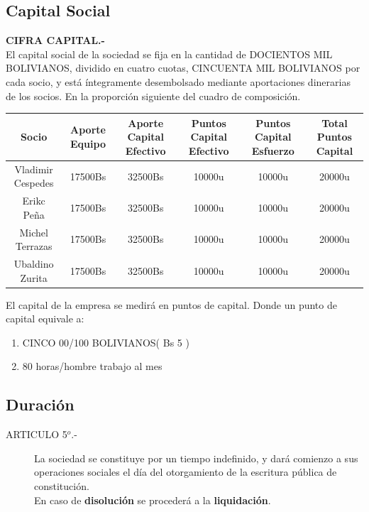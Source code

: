 \documentclass[11pt,letterpaper]{report}
\begin{document}
\subsection{ Capital Social }
\begin{description}
\item[ARTICULO 4$^{o}$.-] {\bf CIFRA CAPITAL.-}\\ El capital social de la sociedad se fija en la cantidad de DOCIENTOS MIL BOLIVIANOS, dividido en cuatro cuotas, CINCUENTA MIL BOLIVIANOS por cada socio, y est\'a \'integramente desembolsado mediante aportaciones dinerarias de los socios. En la proporci\'on siguiente del cuadro de composici\'on.


\begin{tabular}{|c|c|c|c|c|c|}
\hline
Socio & {\tiny Aporte Equipo} & {\tiny Aporte Capital Efectivo } & {\tiny Puntos Capital Efectivo } & {\tiny Puntos Capital Esfuerzo } & {\tiny Total Puntos Capital} \\\hline
Vladimir Cespedes & 17500Bs & 32500Bs & 10000u & 10000u & 20000u \\\hline
Erikc Pe\~na & 17500Bs & 32500Bs & 10000u & 10000u & 20000u \\\hline
Michel Terrazas & 17500Bs & 32500Bs & 10000u & 10000u & 20000u \\\hline
Ubaldino Zurita & 17500Bs & 32500Bs & 10000u & 10000u & 20000u \\\hline
\end{tabular}

\item El capital de la empresa se medir\'a en puntos de capital. Donde un punto de capital equivale a:
\begin{enumerate}
\item CINCO 00/100 BOLIVIANOS( Bs 5 )
\item 80 horas/hombre trabajo al mes
\end{enumerate}



\end{description}
\subsection{ Duraci\'on }
\begin{description}
\item[ARTICULO 5$^{o}$.-] La sociedad se constituye por un tiempo indefinido, y dar\'a comienzo a sus operaciones sociales el d\'ia del otorgamiento de la escritura p\'ublica de constituci\'on.\\
En caso de {\bf disoluci\'on} se proceder\'a a la {\bf liquidaci\'on}.
\end{description}
\end{document}
